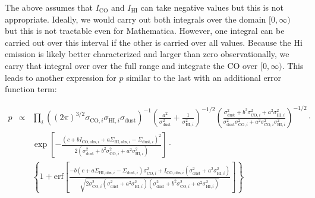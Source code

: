 \documentclass[12pt,preprint]{aastex}
\begin{document}
The above assumes that $I_{\mathrm{CO}}$ and $I_{\mathrm{HI}}$ can
take negative values but this is not appropriate.  Ideally, we would
carry out both integrals over the domain $[0,\infty)$ but this is not
tractable even for Mathematica.  However, one integral can be carried
out over this interval if the other is carried over all
values. Because the {\sc Hi} emission is likely better characterized
and larger than zero observationally, we carry that integral over over
the full range and integrate the CO over  $[0,\infty)$.  This leads to
another expression for $p$ similar to the last with an additional
error function term:

\begin{eqnarray*}
p &\propto& \prod_i  \left((2\pi)^{3/2}
\sigma_{\mathrm{CO},i}\sigma_{\mathrm{HI},i}\sigma_{\mathrm{dust}}\right)^{-1}
\left(\frac{a^2}{\sigma^2_{\mathrm{dust}}}+\frac{1}{\sigma^2_{\mathrm{HI},i}}\right)^{-1/2}
\left(\frac{\sigma^2_{\mathrm{dust}}+b^2\sigma^2_{\mathrm{CO},i}+
a^2\sigma^2_{\mathrm{HI},i}}{\sigma^2_{\mathrm{dust}}\sigma^2_{\mathrm{CO},i}+
a^2 \sigma^2_{\mathrm{CO},i}\sigma^2_{\mathrm{HI},i} }\right)^{-1/2}\cdot\\
&& \exp\left[-\frac{(c+bI_{\mathrm{CO,obs},i}+
a \Sigma_{\mathrm{HI,obs},i}-\Sigma_{\mathrm{dust},i})^2}{2(\sigma^2_{\mathrm{dust}}+b^2\sigma^2_{\mathrm{CO},i}+a^2\sigma^2_{\mathrm{HI},i})}\right]\cdot
\\
&&\left\{1+\mathrm{erf}\left[\frac{-b(c+a\Sigma_{\mathrm{HI,obs},i}-\Sigma_{\mathrm{dust},i})\sigma^2_{\mathrm{CO},i}+I_{\mathrm{CO,obs},i}(\sigma^2_{\mathrm{dust}}+a^2\sigma^2_{\mathrm{HI},i})}{\sqrt{2\sigma^2_{\mathrm{CO},i}
(\sigma^2_{\mathrm{dust}}+a^2\sigma^2_{\mathrm{HI},i})
({\sigma^2_{\mathrm{dust}}+b^2\sigma^2_{\mathrm{CO},i}+
a^2\sigma^2_{\mathrm{HI},i}})}}
\right]\right\}
\end{eqnarray*}
\end{document}
